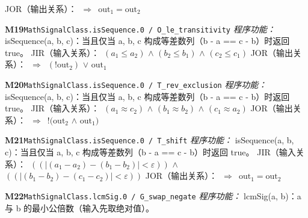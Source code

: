 \documentclass[11pt]{article}
\begin{document}
\hspace*{1.5em}JOR（输出关系）：\ $\Rightarrow$\ $\mathrm{out}_{1} = \mathrm{out}_{2}$\par\medskip
\textbf{M19}\quad \texttt{MathSignalClass.isSequence.0 / O\_le\_transitivity}\newline
\hspace*{1.5em}\emph{程序功能：} isSequence(a, b, c)：当且仅当 a, b, c 构成等差数列（b - a == c - b）时返回 true。\newline
\hspace*{1.5em}JIR（输入关系）：\ $(a_{1}\leq a_{2})$ $\wedge$ $(b_{2}\leq b_{1})$ $\wedge$ $(c_{2}\leq c_{1})$\newline
\hspace*{1.5em}JOR（输出关系）：\ $\Rightarrow$\ $(!\mathrm{out}_{2})$ $\vee$ $\mathrm{out}_{1}$\par\medskip
\textbf{M20}\quad \texttt{MathSignalClass.isSequence.0 / T\_rev\_exclusion}\newline
\hspace*{1.5em}\emph{程序功能：} isSequence(a, b, c)：当且仅当 a, b, c 构成等差数列（b - a == c - b）时返回 true。\newline
\hspace*{1.5em}JIR（输入关系）：\ $(a_{1} \approx  c_{2})$ $\wedge$ $(b_{1} \approx  b_{2})$ $\wedge$ $(c_{1} \approx  a_{2})$\newline
\hspace*{1.5em}JOR（输出关系）：\ $\Rightarrow$\ $!(\mathrm{out}_{2}$ $\wedge$ $\mathrm{out}_{1})$\par\medskip
\textbf{M21}\quad \texttt{MathSignalClass.isSequence.0 / T\_shift}\newline
\hspace*{1.5em}\emph{程序功能：} isSequence(a, b, c)：当且仅当 a, b, c 构成等差数列（b - a == c - b）时返回 true。\newline
\hspace*{1.5em}JIR（输入关系）：\ $((|(a_{1} - a_{2}) - (b_{1} - b_{2})| < \varepsilon))$ $\wedge$ $((|(b_{1} - b_{2}) - (c_{1} - c_{2})| < \varepsilon))$\newline
\hspace*{1.5em}JOR（输出关系）：\ $\Rightarrow$\ $\mathrm{out}_{1} = \mathrm{out}_{2}$\par\medskip
\textbf{M22}\quad \texttt{MathSignalClass.lcmSig.0 / G\_swap\_negate}\newline
\hspace*{1.5em}\emph{程序功能：} lcmSig(a, b)：\textbar{}a\textbar{} 与 \textbar{}b\textbar{} 的最小公倍数（输入先取绝对值）。\newline
\end{document}
